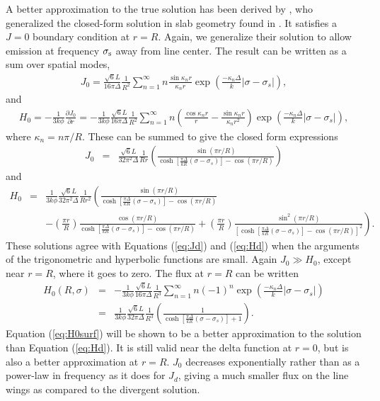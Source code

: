 \documentclass[linenumbers]{aastex63}
\newcommand{\be}{\begin{eqnarray}}
\newcommand{\ee}{\end{eqnarray}}
\begin{document}
A better approximation to the true solution has been derived by \citet{2006ApJ...649...14D}, who generalized the closed-form solution in slab geometry found in \citet{1990ApJ...350..216N}. It satisfies a $J=0$ boundary condition at $r=R$. Again, we generalize their solution to allow emission at frequency $\sigma_{\rm s}$ away from line center. The result can be written as a sum over spatial modes,
\be \label{eq:J0_sum}
J_0 = \frac{\sqrt{6}L}{16\pi \Delta} \frac{1}{R^2}\sum_{n=1}^{\infty}n\frac{\sin{\kappa_n r}}{\kappa_n r}\exp{\left(\frac{-\kappa_n \Delta}{k}|\sigma - \sigma_s|\right)},
\ee
and
\be \label{eq:H0_sum}
H_0 = - \frac{1}{3k\phi} \frac{\partial J_0}{\partial r} = -\frac{1}{3k\phi}\frac{\sqrt{6}L}{16\pi\Delta} \frac{1}{R^2}\sum_{n=1}^{\infty}n\left(\frac{\cos{\kappa_n r}}{r} - \frac{\sin{\kappa_n r}}{\kappa_n r^2}\right)\exp{\left(\frac{-\kappa_n \Delta}{k}|\sigma - \sigma_s|\right)},
\ee
where $\kappa_n=n\pi/R$. These can be summed to give the closed form expressions
\be
J_0 & = & \frac{\sqrt{6}L}{32\pi^2 \Delta}
\frac{1}{Rr}
\left( 
\frac{ \sin(\pi r/R) }{ \cosh \left[ \frac{\pi \Delta}{k R} (\sigma - \sigma_s) \right] - \cos(\pi r/R)}
\right)
\label{eq:J0}
\ee
and
\be
H_0 & = &\frac{1}{3k\phi}
\frac{\sqrt{6}L}{32\pi^2 \Delta}
\frac{1}{Rr^2}
\left( 
\frac{ \sin(\pi r/R) }{ \cosh \left[ \frac{\pi \Delta}{k R} (\sigma - \sigma_s) \right] - \cos(\pi r/R)}
\right. \nonumber \\ & & \left. - \left( \frac{\pi r}{R} \right)
\frac{ \cos(\pi r/R) }{ \cosh \left[ \frac{\pi \Delta}{k R} (\sigma - \sigma_s) \right] - \cos(\pi r/R)}
+ \left( \frac{\pi r}{R} \right)
\frac{ \sin^2(\pi r/R) }{ \left[ \cosh \left[ \frac{\pi \Delta}{k R} (\sigma - \sigma_s) \right] - \cos(\pi r/R) \right]^2 }
\right).
\label{eq:H0}
\ee
These solutions agree with Equations (\ref{eq:Jd}) and (\ref{eq:Hd}) when the arguments of the trigonometric and hyperbolic functions are small. Again $J_0 \gg H_0$, except near $r=R$, where it goes to zero. The flux at $r=R$ can be written
\be
\nonumber
H_0(R, \sigma) & = & - \frac{1}{3k\phi}
\frac{\sqrt{6}L}{16\pi \Delta}
\frac{1}{R^3}
\sum_{n=1}^{\infty} 
n (-1)^n \exp{\left(\frac{-\kappa_n \Delta}{k}|\sigma - \sigma_s|\right)}\\
& = &  \frac{1}{3k\phi}
\frac{\sqrt{6}L}{32\pi \Delta}
\frac{1}{R^3}
\left( 
\frac{ 1 }{ \cosh \left[ \frac{\pi \Delta}{k R} (\sigma - \sigma_s) \right] +1 }
\right).
\label{eq:H0surf}
\ee
Equation (\ref{eq:H0surf}) will be shown to be a better approximation to the solution than Equation (\ref{eq:Hd}). It is still valid near the delta function at $r=0$, but is also a better approximation at $r=R$. $J_0$ decreases exponentially rather than as a power-law in frequency as it does for $J_d$, giving a much smaller flux on the line wings as compared to the divergent solution. 
\end{document}
